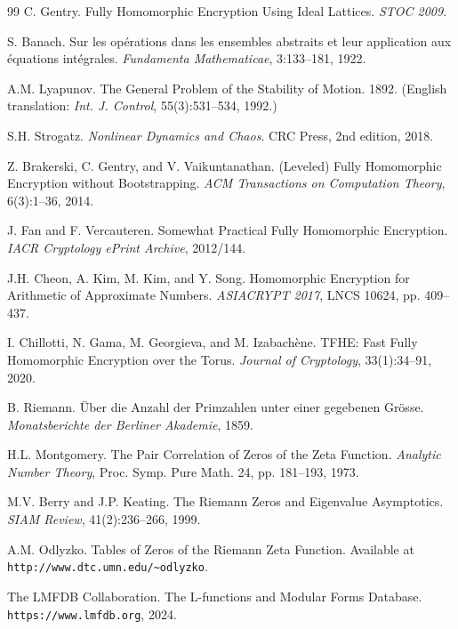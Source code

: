 \documentclass[11pt,a4paper]{article}
\begin{document}
\begin{thebibliography}{99}
 C. Gentry. Fully Homomorphic Encryption Using Ideal Lattices. \textit{STOC 2009}.

 S. Banach. Sur les op\'{e}rations dans les ensembles abstraits et leur application aux \'{e}quations int\'{e}grales. \textit{Fundamenta Mathematicae}, 3:133--181, 1922.

 A.M. Lyapunov. The General Problem of the Stability of Motion. 1892. (English translation: \textit{Int. J. Control}, 55(3):531--534, 1992.)

 S.H. Strogatz. \textit{Nonlinear Dynamics and Chaos}. CRC Press, 2nd edition, 2018.

 Z. Brakerski, C. Gentry, and V. Vaikuntanathan. (Leveled) Fully Homomorphic Encryption without Bootstrapping. \textit{ACM Transactions on Computation Theory}, 6(3):1--36, 2014.

 J. Fan and F. Vercauteren. Somewhat Practical Fully Homomorphic Encryption. \textit{IACR Cryptology ePrint Archive}, 2012/144.

 J.H. Cheon, A. Kim, M. Kim, and Y. Song. Homomorphic Encryption for Arithmetic of Approximate Numbers. \textit{ASIACRYPT 2017}, LNCS 10624, pp. 409--437.

 I. Chillotti, N. Gama, M. Georgieva, and M. Izabach\`{e}ne. TFHE: Fast Fully Homomorphic Encryption over the Torus. \textit{Journal of Cryptology}, 33(1):34--91, 2020.

 B. Riemann. \"{U}ber die Anzahl der Primzahlen unter einer gegebenen Gr\"{o}sse. \textit{Monatsberichte der Berliner Akademie}, 1859.

 H.L. Montgomery. The Pair Correlation of Zeros of the Zeta Function. \textit{Analytic Number Theory}, Proc. Symp. Pure Math. 24, pp. 181--193, 1973.

 M.V. Berry and J.P. Keating. The Riemann Zeros and Eigenvalue Asymptotics. \textit{SIAM Review}, 41(2):236--266, 1999.

 A.M. Odlyzko. Tables of Zeros of the Riemann Zeta Function. Available at \texttt{http://www.dtc.umn.edu/\~{}odlyzko}.

 The LMFDB Collaboration. The L-functions and Modular Forms Database. \texttt{https://www.lmfdb.org}, 2024.


\end{thebibliography}
\end{document}
